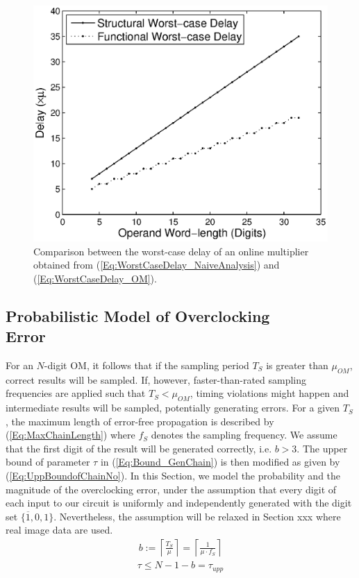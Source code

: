 \documentclass{acm_proc_article-sp}
\begin{document}
%
\begin{figure}[t]
    \centering
    \includegraphics[width=.4\textwidth]{./Figures/Gap.eps}
    \caption{Comparison between the worst-case delay of an online multiplier obtained from (\ref{Eq:WorstCaseDelay_NaiveAnalysis}) and (\ref{Eq:WorstCaseDelay_OM}).}
\label{Fig:Gap_OM}
\end{figure}


\subsection{Probabilistic Model of Overclocking \\Error}
For an $N$-digit OM, it follows that if the sampling period $T_S$ is greater than $\mu_{OM}$, correct results will be sampled. If, however, faster-than-rated sampling frequencies are applied such that $T_S<\mu_{OM}$, timing violations might happen and intermediate results will be sampled, potentially generating errors. For a given $T_S$, the maximum length of error-free propagation is described by (\ref{Eq:MaxChainLength}) where $f_S$ denotes the sampling frequency. We assume that the first digit of the result will be generated correctly, i.e. $b>3$. The upper bound of parameter $\tau$ in (\ref{Eq:Bound_GenChain}) is then modified as given by (\ref{Eq:UppBoundofChainNo}). In this Section, we model the probability and the magnitude of the overclocking error, under the assumption that every digit of each input to our circuit is uniformly and independently generated with the digit set $\{\overline{1},0,1\}$. Nevertheless, the assumption will be relaxed in Section xxx where real image data are used.
%
\begin{eqnarray}\label{Eq:MaxChainLength}
  b:=\left\lceil \frac{T_S}{\mu} \right\rceil=\left\lceil \frac{1}{\mu\cdot f_S}\right\rceil
\end{eqnarray}
%
%
\begin{eqnarray}\label{Eq:UppBoundofChainNo}
  \tau\leqslant N-1-b=\tau_{upp}
\end{eqnarray}
\end{document}
